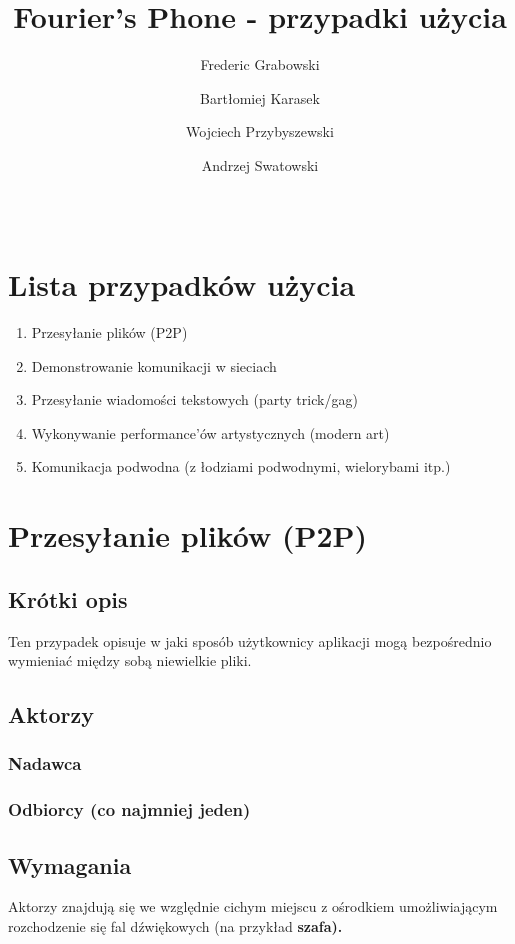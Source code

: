 \documentclass{article}
\title{Fourier's Phone - przypadki użycia}
\author{Frederic Grabowski \and Bartłomiej Karasek \and Wojciech Przybyszewski 
        \and Andrzej Swatowski}
\date{\documentdate \\ \documentversion}
\begin{document}
\maketitle
\newpage

\tableofcontents
\newpage

\section{Lista przypadków użycia}
    \begin{enumerate}
        \item Przesyłanie plików (P2P)
        \item Demonstrowanie komunikacji w sieciach
        \item Przesyłanie wiadomości tekstowych (party trick/gag)
        \item Wykonywanie performance'ów artystycznych (modern art)
        \item Komunikacja podwodna (z łodziami podwodnymi, wielorybami itp.)
    \end{enumerate}

\newpage
\section{Przesyłanie plików (P2P)}
\subsection{Krótki opis}
Ten przypadek opisuje w jaki sposób użytkownicy aplikacji mogą bezpośrednio wymieniać między sobą niewielkie pliki.
\subsection{Aktorzy}
\subsubsection{Nadawca}
\subsubsection{Odbiorcy (co najmniej jeden)}
\subsection{Wymagania}
Aktorzy znajdują się we względnie cichym miejscu z ośrodkiem umożliwiającym rozchodzenie się fal dźwiękowych (na przykład \bf{szafa}).
\end{document}
